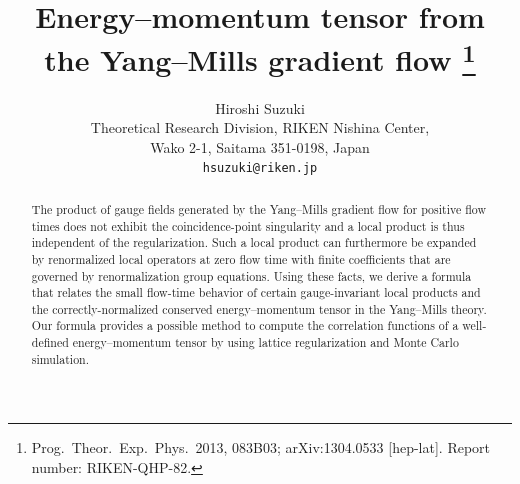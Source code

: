 \documentclass[11pt]{article}
\numberwithin{equation}{section}
\begin{document}
\title{Energy--momentum tensor from the Yang--Mills gradient flow%
\thanks{Prog.\ Theor.\ Exp.\ Phys.\ 2013, 083B03;
arXiv:1304.0533 [hep-lat]. Report number: RIKEN-QHP-82.}}

\author{Hiroshi Suzuki\\[4pt]
Theoretical Research Division, RIKEN Nishina Center,\\
Wako 2-1, Saitama 351-0198, Japan\\
\texttt{hsuzuki@riken.jp}}
\date{}

\maketitle

\begin{abstract}
The product of gauge fields generated by the Yang--Mills gradient flow for
positive flow times does not exhibit the coincidence-point singularity and a
local product is thus independent of the regularization. Such a local product
can furthermore be expanded by renormalized local operators at zero flow time
with finite coefficients that are governed by renormalization group equations.
Using these facts, we derive a formula that relates the small flow-time
behavior of certain gauge-invariant local products and the correctly-normalized
conserved energy--momentum tensor in the Yang--Mills theory. Our formula
provides a possible method to compute the correlation functions of a
well-defined energy--momentum tensor by using lattice regularization and Monte
Carlo simulation.
\end{abstract}








\end{document}
